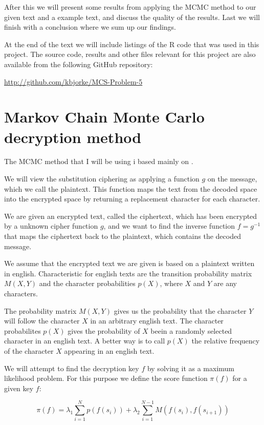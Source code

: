 \documentclass[a4paper, 11pt]{article}
\begin{document}
After this we will present some results from applying the MCMC method to
our given text and a example text, and discuss the quality of the results.
Last we will finish with a conclusion where we sum up our findings.

At the end of the text we will include listings of the R code that was used
in this project. The source code, results and other files relevant for this
project are also available from the following GitHub repository:

\href{http://github.com/kbjorke/MCS-Problem-5}{http://github.com/kbjorke/MCS-Problem-5}


\section{Markov Chain Monte Carlo decryption method}

The MCMC method that I will be using i based mainly on \cite{Kocmanek}.

We will view the substitution ciphering as applying a function $g$ on the
message, which we call the plaintext. This function maps the text from the
decoded space into the encrypted space by returning a replacement character
for each character.

We are given an encrypted text, called the ciphertext, which has been 
encrypted by a unknown cipher function $g$, and we want to find the 
inverse function $f = g^{-1}$ that maps the ciphertext back to the plaintext,
which contains the decoded message.

We assume that the encrypted text we are given is based on a plaintext 
written in english. Characteristic for english texts are the transition 
probability matrix $M(X,Y)$ and the character probabilities $p(X)$, where
$X$ and $Y$ are any characters.

The probability matrix $M(X,Y)$ gives us the probability that the character
$Y$ will follow the character $X$ in an arbitrary english text. The
character probabilites $p(X)$ gives the probability of $X$ beein a randomly
selected character in an english text. A better way is to call $p(X)$ the
relative frequency of the character $X$ appearing in an english text.

We will attempt to find the decryption key $f$ by solving it as a maximum
likelihood problem. For this purpose we define the score function $\pi(f)$ 
for a given key $f$:

\begin{equation}
  \pi(f) = \lambda_1 \sum_{i=1}^{N} p(f(s_i)) + 
  \lambda_2 \sum_{i=1}^{N-1} M(f(s_i),f(s_{i+1}))
  \label{eq:ScoreFunc}
\end{equation}
\end{document}
